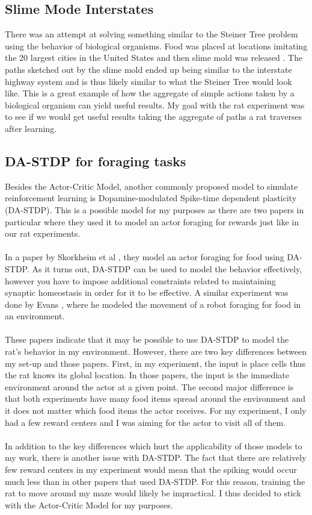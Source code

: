 \documentclass[conference]{IEEEtran}
\begin{document}
\subsection{Slime Mode Interstates}

There was an attempt at solving something similar to the Steiner Tree problem using the behavior of biological organisms. Food was placed at locations imitating the 20 largest cities in the United States and then slime mold was released \cite{slimemold}. The paths sketched out by the slime mold ended up being similar to the interstate highway system and is thus likely similar to what the Steiner Tree would look like. This is a great example of how the aggregate of simple actions taken by a biological organism can yield useful results. My goal with the rat experiment was to see if we would get useful results taking the aggregate of paths a rat traverses after learning.

\subsection{DA-STDP for foraging tasks}

Besides the Actor-Critic Model, another commonly proposed model to simulate reinforcement learning is Dopamine-modulated Spike-time dependent plasticity (DA-STDP). This is a possible model for my purposes as there are two papers in particular where they used it to model an actor foraging for rewards just like in our rat experiments. \\
\\
In a paper by Skorkheim et al \cite{plosone}, they model an actor foraging for food using DA-STDP. As it turns out, DA-STDP can be used to model the behavior effectively, however you have to impose additional constraints related to maintaining synaptic homeostasis in order for it to be effective. A similar experiment was done by Evans \cite{robot}, where he modeled the movement of a robot foraging for food in an environment. \\
\\
These papers indicate that it may be possible to use DA-STDP to model the rat's behavior in my environment. However, there are two key differences between my set-up and those papers. First, in my experiment, the input is place cells thus the rat knows its global location. In those papers, the input is the immediate environment around the actor at a given point. The second major difference is that both experiments have many food items spread around the environment and it does not matter which food items the actor receives. For my experiment, I only had a few reward centers and I was aiming for the actor to visit all of them. \\
\\
In addition to the key differences which hurt the applicability of those models to my work, there is another issue with DA-STDP. The fact that there are relatively few reward centers in my experiment would mean that the spiking would occur much less than in other papers that used DA-STDP. For this reason, training the rat to move around my maze would likely be impractical. I thus decided to stick with the Actor-Critic Model for my purposes. 
\end{document}
